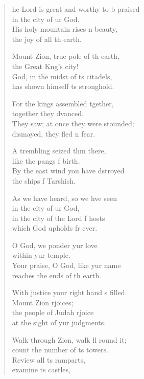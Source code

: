 \begin{verse}
  \begin{patverse}
    he Lord is great and worthy to b praised\Med\\
in the city of ur God.\\
His holy mountain rises \pointup{\i}n beauty,\Med\\
the joy of all th earth.

Mount Zion, true pole of th earth,\Med\\
the Great K\pointup{\i}ng’s city!\\
God, in the midst of \pointup{\i}ts citadels,\Med\\
has shown himself \pointup{\i}ts stronghold.

For the kings assembled tgether,\Med\\
together they dvanced.\\
They saw; at once they were stounded;\Med\\
dismayed, they fled \pointup{\i}n fear.

A trembling seized thm there,\Med\\
like the pangs f birth.\\
By the east wind you have dstroyed\Med\\
the ships f Tarshish.

As we have heard, so we hve seen\Med\\
in the city of ur God,\\
in the city of the Lord f hosts\Med\\
which God upholds fr ever.

O God, we ponder yur love\Med\\
within yur temple.\\
Your praise, O God, like yur name\Med\\
reaches the ends of th earth.

With justice your right hand \pointup{\i}s filled.\Med\\
Mount Zion rjoices;\\
the people of Judah rjoice\Med\\
at the sight of yur judgments.

Walk through Zion, walk ll round it;\Med\\
count the number of \pointup{\i}ts towers.\\
Review all \pointup{\i}ts ramparts,\Med\\
examine \pointup{\i}ts castles,


\end{patverse}
\end{verse}
